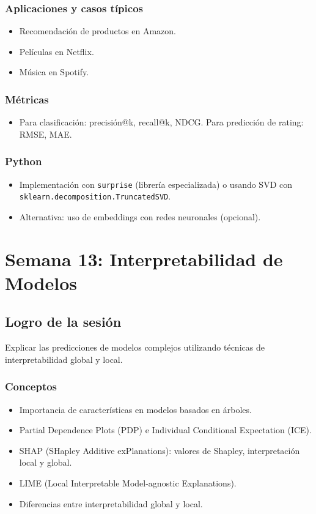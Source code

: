 \documentclass[12pt,a4paper,openany,oneside]{book}
\begin{document}
\subsection{Aplicaciones y casos típicos}
\begin{itemize}
    \item Recomendación de productos en Amazon.
    \item Películas en Netflix.
    \item Música en Spotify.
\end{itemize}

\subsection{Métricas}
\begin{itemize}
    \item Para clasificación: precisión@k, recall@k, NDCG. Para predicción de rating: RMSE, MAE.
\end{itemize}

\subsection{Python}
\begin{itemize}
    \item Implementación con \texttt{surprise} (librería especializada) o usando SVD con \texttt{sklearn.decomposition.TruncatedSVD}.
    \item Alternativa: uso de embeddings con redes neuronales (opcional).
\end{itemize}

\chapter{Semana 13: Interpretabilidad de Modelos}

\section{Logro de la sesión}
Explicar las predicciones de modelos complejos utilizando técnicas de interpretabilidad global y local.

\subsection{Conceptos}
\begin{itemize}
    \item Importancia de características en modelos basados en árboles.
    \item Partial Dependence Plots (PDP) e Individual Conditional Expectation (ICE).
    \item SHAP (SHapley Additive exPlanations): valores de Shapley, interpretación local y global.
    \item LIME (Local Interpretable Model-agnostic Explanations).
    \item Diferencias entre interpretabilidad global y local.
\end{itemize}
\end{document}
